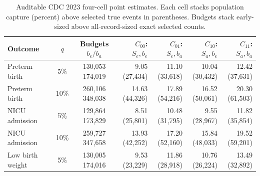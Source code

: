 \begin{table}[htbp]
\centering
\caption{Auditable CDC 2023 four-cell point estimates. Each cell stacks population capture (percent) above selected true events in parentheses. Budgets stack early-sized above all-record-sized exact selected counts.}
\label{tab:four_cells}
\footnotesize
\setlength{\tabcolsep}{3.4pt}
\begin{tabular*}{\linewidth}{@{\extracolsep{\fill}}lccrrrr@{}}
\toprule
Outcome & $q$ & Budgets $b_e/b_a$ & $C_{00}$: $S_e,b_e$ & $C_{01}$: $S_e,b_a$ & $C_{10}$: $S_a,b_e$ & $C_{11}$: $S_a,b_a$ \\
\midrule
Preterm birth & 5\% & \shortstack{130,053\\174,019} & \shortstack[r]{9.05\\(27,434)} & \shortstack[r]{11.10\\(33,618)} & \shortstack[r]{10.04\\(30,432)} & \shortstack[r]{12.42\\(37,631)} \\
\addlinespace[3pt]
Preterm birth & 10\% & \shortstack{260,106\\348,038} & \shortstack[r]{14.63\\(44,326)} & \shortstack[r]{17.89\\(54,216)} & \shortstack[r]{16.52\\(50,061)} & \shortstack[r]{20.30\\(61,503)} \\
\addlinespace[3pt]
NICU admission & 5\% & \shortstack{129,864\\173,829} & \shortstack[r]{8.51\\(25,801)} & \shortstack[r]{10.48\\(31,795)} & \shortstack[r]{9.55\\(28,967)} & \shortstack[r]{11.82\\(35,854)} \\
\addlinespace[3pt]
NICU admission & 10\% & \shortstack{259,727\\347,658} & \shortstack[r]{13.93\\(42,252)} & \shortstack[r]{17.20\\(52,160)} & \shortstack[r]{15.84\\(48,033)} & \shortstack[r]{19.52\\(59,201)} \\
\addlinespace[3pt]
Low birth weight & 5\% & \shortstack{130,005\\174,016} & \shortstack[r]{9.53\\(23,229)} & \shortstack[r]{11.86\\(28,918)} & \shortstack[r]{10.76\\(26,224)} & \shortstack[r]{13.49\\(32,892)} \\

\end{tabular*}
\end{table}

